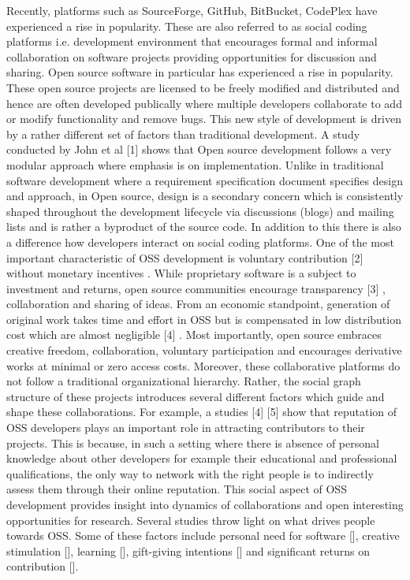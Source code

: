 Recently, platforms such as SourceForge, GitHub, BitBucket, CodePlex have experienced a rise in popularity. These are also referred to as social coding platforms i.e. development environment that encourages formal and informal collaboration on software projects providing opportunities for discussion and sharing. Open source software in particular has experienced a rise in popularity. These open source projects are licensed to be freely modified and distributed and hence are often developed publically where multiple developers collaborate to add or modify functionality and remove bugs. This new style of development is driven by a rather different set of factors than traditional development. A study conducted by John et al [1] shows that Open source development follows a very modular approach where emphasis is on implementation. Unlike in traditional software development where a requirement specification document specifies design and approach, in Open source, design is a secondary concern which is consistently shaped throughout the development lifecycle via discussions (blogs) and mailing lists and is rather a byproduct of the source code. In addition to this there is also a difference how developers interact on social coding platforms. One of the most important characteristic of OSS development is voluntary contribution [2] without monetary incentives . While proprietary software is a subject to investment and returns, open source communities encourage transparency [3] , collaboration and sharing of ideas. From an economic standpoint, generation of original work takes time and effort in OSS but is compensated in low distribution cost which are almost negligible [4] . Most importantly, open source embraces creative freedom, collaboration, voluntary participation and encourages derivative works at minimal or zero access costs. Moreover, these collaborative platforms do not follow a traditional organizational hierarchy. Rather, the social graph structure of these projects introduces several different factors which guide and shape these collaborations. For example, a studies [4] [5] show that reputation of OSS developers plays an important role in attracting contributors to their projects. This is because, in such a setting where there is absence of personal knowledge about other developers for example their educational and professional qualifications, the only way to network with the right people is to indirectly assess them through their online reputation. This social aspect of OSS development provides insight into dynamics of collaborations and open interesting opportunities for research. Several studies throw light on what drives people towards OSS. Some of these factors include personal need for software [], creative stimulation [], learning [], gift-giving intentions [] and significant returns on contribution []. 
